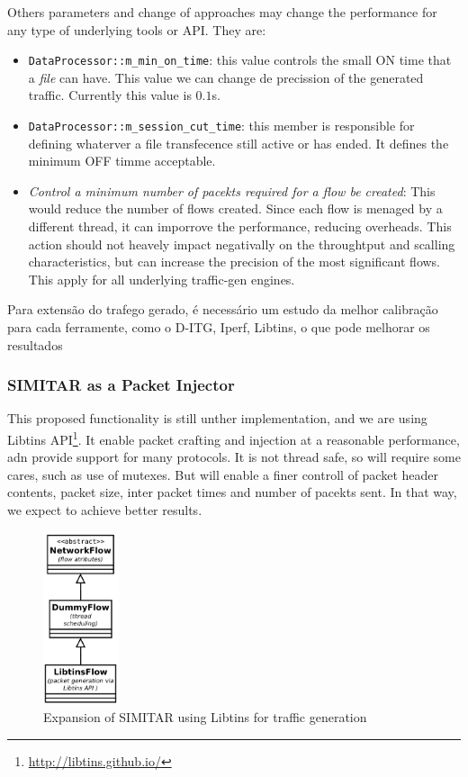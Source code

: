 Others parameters and change of approaches may change the performance for any type of underlying tools or API. They are:

\begin{itemize}

	\item \texttt{DataProcessor::m\_min\_on\_time}: this value controls the small ON time that a \textit{file} can have. This value we can change de precission of the generated traffic. Currently this value is $0.1$s. 
	
	\item \texttt{DataProcessor::m\_session\_cut\_time}:  this member is responsible for defining whaterver a file transfecence still active or has ended. It defines the minimum OFF timme acceptable.
	
	\item \textit{Control a minimum number of pacekts required for a flow be created}: This would reduce the number of flows created. Since each flow is menaged by a different thread, it can imporrove the performance, reducing overheads. This action should not heavely impact negativally on the throughtput and scalling characteristics, but can increase the precision of the most significant flows. This apply for all underlying traffic-gen engines.
	
	
\end{itemize}



Para extensão do trafego gerado, é necessário um estudo da melhor calibração para cada ferramente, como o D-ITG, Iperf, Libtins, o que pode melhorar os resultados

\subsubsection{SIMITAR as a Packet Injector}

This proposed functionality is still unther implementation, and we are using Libtins API\footnote{\href{http://libtins.github.io/}{http://libtins.github.io/}}. It enable packet crafting and injection at a reasonable performance, adn provide support for many protocols. It is not thread safe, so will require some cares, such as use of mutexes. But will enable a finer controll of packet header contents, packet size, inter packet times and number of pacekts sent. In that way, we expect to achieve better results.  



\begin{figure}[!ht]
	\centering
	\includegraphics[height=2.0in]{figures/ch6/libtins-flow}
	\caption{Expansion of SIMITAR using Libtins for traffic generation}
	\label{fig:libtins-flow}
\end{figure}

